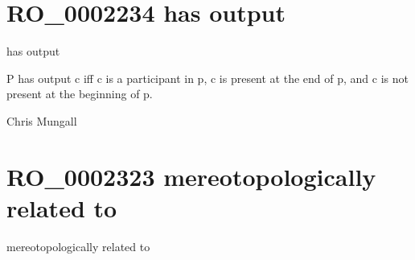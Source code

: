 \documentclass[letterpaper,10pt,english]{sphinxmanual}
\begin{document}
\section{RO\_0002234 \sphinxhyphen{} has output}
\label{\detokenize{doc-RO_0002234:ro-0002234-has-output}}\label{\detokenize{doc-RO_0002234:index-0}}\label{\detokenize{doc-RO_0002234::doc}}
\begin{sphinxShadowBox}

\sphinxAtStartPar
has output
\end{sphinxShadowBox}

\begin{sphinxShadowBox}

\sphinxAtStartPar
P has output c iff c is a participant in p, c is present at the end of p, and c is not present at the beginning of p.
\end{sphinxShadowBox}

\begin{sphinxShadowBox}

\sphinxAtStartPar
{}
\end{sphinxShadowBox}

\begin{sphinxShadowBox}

\sphinxAtStartPar
Chris Mungall
\end{sphinxShadowBox}
\begin{quote}
\label{\detokenize{doc-RO_0002323:ro-0002323}}\label{\detokenize{doc-RO_0002323:mereotopologically-related-to}}\label{\detokenize{doc-RO_0002323:ro-0002323}}
\ignorespaces \end{quote}


\section{RO\_0002323 \sphinxhyphen{} mereotopologically related to}
\label{\detokenize{doc-RO_0002323:ro-0002323-mereotopologically-related-to}}\label{\detokenize{doc-RO_0002323:index-0}}\label{\detokenize{doc-RO_0002323::doc}}
\begin{sphinxShadowBox}

\sphinxAtStartPar
mereotopologically related to
\end{sphinxShadowBox}
\end{document}
